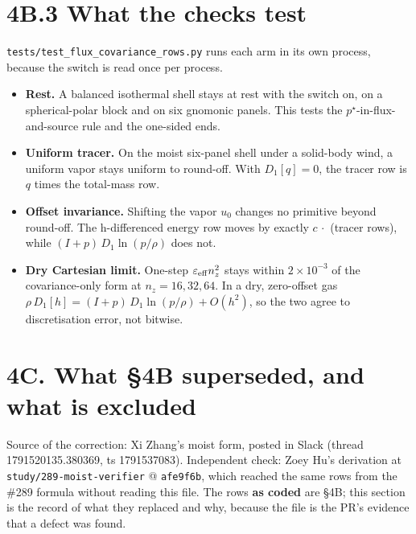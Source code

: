 \documentclass[11pt,a4paper]{article}
\begin{document}
\section*{4B.3 What the checks test}

\texttt{tests/test\_flux\_covariance\_rows.py} runs each arm in its own process, because
the switch is read once per process.

\begin{itemize}
\item \textbf{Rest.} A balanced isothermal shell stays at rest with the switch on, on a
  spherical-polar block and on six gnomonic panels. This tests the
  $p^\star$-in-flux-and-source rule and the one-sided ends.
\item \textbf{Uniform tracer.} On the moist six-panel shell under a solid-body wind, a
  uniform vapor stays uniform to round-off. With $D_1[q]=0$, the tracer row is
  $q$ times the total-mass row.
\item \textbf{Offset invariance.} Shifting the vapor $u_0$ changes no primitive beyond
  round-off. The h-differenced energy row moves by exactly $c\,\cdot$ (tracer
  rows), while $(I+p)\,D_1\ln(p/\rho)$ does not.
\item \textbf{Dry Cartesian limit.} One-step $\varepsilon_{\rm eff}n_z^2$ stays within
  $2\times10^{-3}$ of the covariance-only form at $n_z=16,32,64$. In a dry,
  zero-offset gas $\rho\,D_1[h]=(I+p)\,D_1\ln(p/\rho)+O(h^2)$, so the two agree
  to discretisation error, not bitwise.
\end{itemize}

\hrulefill

\section*{4C. What §4B superseded, and what is excluded}

Source of the correction: Xi Zhang's moist form, posted in Slack
(thread 1791520135.380369, ts 1791537083). Independent check: Zoey Hu's
derivation at \texttt{study/289-moist-verifier} @ \texttt{afe9f6b}, which reached the same
rows from the \#289 formula without reading this file. The rows \textbf{as coded} are
§4B; this section is the record of what they replaced and why, because the
file is the PR's evidence that a defect was found.
\end{document}
